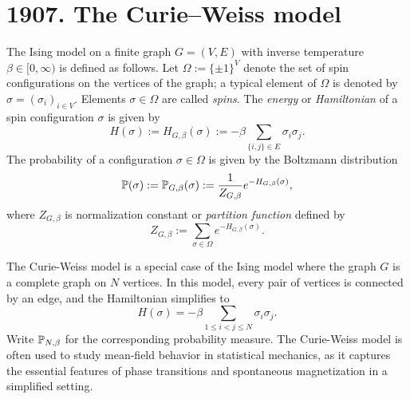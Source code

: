 \section{1907. The Curie--Weiss model}
\label{sec:definitions_examples}

\begin{definition}
    The Ising model on a finite graph \( G = (V, E) \) with inverse temperature \( \beta \in [0,\infty) \) is defined as follows.
    Let $\Omega:=\{\pm1\}^V$ denote the set of spin configurations on the vertices of the graph;
    a typical element of $\Omega$ is denoted by $\sigma=(\sigma_i)_{i\in V}$.
    Elements $\sigma\in\Omega$ are called \emph{spins}.
    The \emph{energy} or \emph{Hamiltonian} of a spin configuration $\sigma$ is given by
    \[
    H(\sigma) := H_{G,\beta}(\sigma) := -\beta \sum_{\{i,j\} \in E} \sigma_i \sigma_j.
    \]
    The probability of a configuration \(\sigma\in\Omega\) is given by the Boltzmann distribution
    \[
    \P(\sigma) := \P_{G,\beta}(\sigma) := \frac{1}{Z_{G,\beta}} e^{-H_{G,\beta}(\sigma)},
    \]
    where \(Z_{G,\beta}\) is normalization constant or \emph{partition function} defined by
    \[
    Z_{G,\beta} := \sum_{\sigma\in\Omega} e^{-H_{G,\beta}(\sigma)}.
    \]
\end{definition}

\begin{definition}
    The Curie-Weiss model is a special case of the Ising model where the graph \( G \) is a complete graph on \( N \) vertices. In this model, every pair of vertices is connected by an edge, and the Hamiltonian simplifies to
    \[
    H(\sigma) = -\beta \sum_{1 \leq i < j \leq N} \sigma_i \sigma_j.
    \]
    Write $\P_{N,\beta}$ for the corresponding probability measure.
    The Curie-Weiss model is often used to study mean-field behavior in statistical mechanics, as it captures the essential features of phase transitions and spontaneous magnetization in a simplified setting.
\end{definition}

